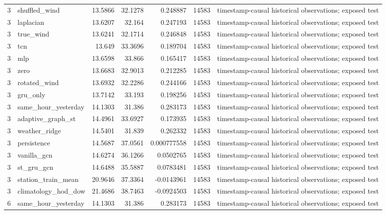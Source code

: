 \begin{tabular}{rlrrrrl}
3 & shuffled\_wind & 13.5866 & 32.1278 & 0.248887 & 14583 & timestamp-causal historical observations; exposed test \\
3 & laplacian & 13.6207 & 32.164 & 0.247193 & 14583 & timestamp-causal historical observations; exposed test \\
3 & true\_wind & 13.6241 & 32.1714 & 0.246848 & 14583 & timestamp-causal historical observations; exposed test \\
3 & tcn & 13.649 & 33.3696 & 0.189704 & 14583 & timestamp-causal historical observations; exposed test \\
3 & mlp & 13.6598 & 33.866 & 0.165417 & 14583 & timestamp-causal historical observations; exposed test \\
3 & zero & 13.6683 & 32.9013 & 0.212285 & 14583 & timestamp-causal historical observations; exposed test \\
3 & rotated\_wind & 13.6932 & 32.2286 & 0.244166 & 14583 & timestamp-causal historical observations; exposed test \\
3 & gru\_only & 13.7142 & 33.193 & 0.198256 & 14583 & timestamp-causal historical observations; exposed test \\
3 & same\_hour\_yesterday & 14.1303 & 31.386 & 0.283173 & 14583 & timestamp-causal historical observations; exposed test \\
3 & adaptive\_graph\_st & 14.4961 & 33.6927 & 0.173935 & 14583 & timestamp-causal historical observations; exposed test \\
3 & weather\_ridge & 14.5401 & 31.839 & 0.262332 & 14583 & timestamp-causal historical observations; exposed test \\
3 & persistence & 14.5687 & 37.0561 & 0.000777558 & 14583 & timestamp-causal historical observations; exposed test \\
3 & vanilla\_gcn & 14.6274 & 36.1266 & 0.0502765 & 14583 & timestamp-causal historical observations; exposed test \\
3 & st\_gru\_gcn & 14.6488 & 35.5887 & 0.0783481 & 14583 & timestamp-causal historical observations; exposed test \\
3 & station\_train\_mean & 20.9646 & 37.3364 & -0.0143961 & 14583 & timestamp-causal historical observations; exposed test \\
3 & climatology\_hod\_dow & 21.4686 & 38.7463 & -0.0924503 & 14583 & timestamp-causal historical observations; exposed test \\
6 & same\_hour\_yesterday & 14.1303 & 31.386 & 0.283173 & 14583 & timestamp-causal historical observations; exposed test \\

\end{tabular}
